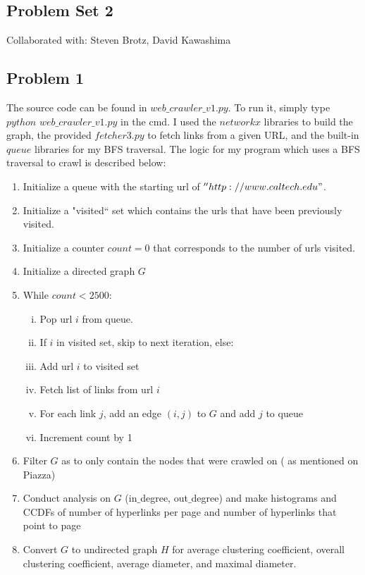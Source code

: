 \documentclass[12 pt]{article}
\begin{document}
	\begin{center}
		\section*{Problem Set 2}
	\end{center}
	\noindent Collaborated with: Steven Brotz, David Kawashima \\
	
	\subsection*{Problem 1}
	\noindent The source code can be found in $web\_crawler\_v1.py$. To run it, simply type $python$ $web\_crawler\_v1.py$ in the cmd. I used the $networkx$ libraries to build the graph, the provided $fetcher3.py$ to fetch links from a given URL, and the built-in $queue$ libraries for my BFS traversal. The logic for my program which uses a BFS traversal to crawl is described below:
	
	\begin{enumerate}
		\item Initialize a queue with the starting url of $''http://www.caltech.edu"$. 
		\item Initialize a "visited`` set which contains the urls that have been previously visited. 
		\item Initialize a counter $count = 0$ that corresponds to the number of urls visited.
		\item Initialize a directed graph $G$
		\item While $count < 2500$:
		\begin{enumerate}[i.]
			\item Pop url $i$ from queue.
			\item If $i$ in visited set, skip to next iteration, else:
			\item Add url $i$ to visited set
			\item Fetch list of links from url $i$
			\item For each link $j$, add an edge $(i, j)$ to $G$ and add $j$ to queue
			\item Increment count by 1
		\end{enumerate}
		\item Filter $G$ as to only contain the nodes that were crawled on ( as mentioned on Piazza)
		\item Conduct analysis on $G$ (in$\_$degree, out$\_$degree) and make histograms and CCDFs of number of hyperlinks per page and number of hyperlinks that point to page
		\item Convert $G$ to undirected graph $H$ for average clustering coefficient, overall clustering coefficient, average diameter, and maximal diameter.
	\end{enumerate} 
\end{document}

